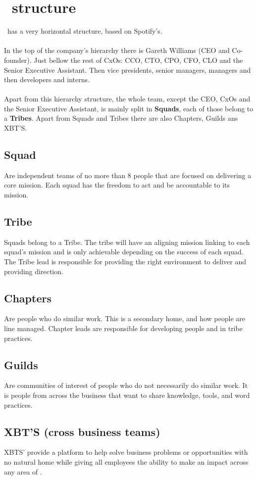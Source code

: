 \chapter{\company\ structure} 

\label{appendix_a}

\company\ has a very horizontal structure, based on Spotify's\cite{culture_of_growth}.
\\\\
In the top of the company's hierarchy there is Gareth Williams (CEO and Co-founder). Just bellow the rest of CxOs: CCO, CTO, CPO, CFO, CLO and the Senior Executive Assistant. Then vice presidents, senior managers, managers and then developers and interns\cite{crew_chart}.
\\\\
Apart from this hierarchy structure, the whole team, except the CEO, CxOs and the Senior Executive Assistant, is mainly split in \textbf{Squads}, each of those belong to a \textbf{Tribes}. Apart from Squads and Tribes there are also Chapters, Guilds ans XBT'S\cite{how_skyscanner_works}.

\section*{Squad}

Are independent teams of no more than 8 people that are focused on delivering a core mission. Each squad has the freedom to act and be accountable to its mission.

\section*{Tribe}

Squads belong to a Tribe. The tribe will have an aligning mission linking to each squad's mission and is only achievable depending on the success of each squad. The Tribe lead is responsible for providing the right environment to deliver and providing direction. 

\section*{Chapters}

Are people who do similar work. This is a secondary home, and how people are line managed. Chapter leads are responsible for developing people and in tribe practices.

\section*{Guilds}

Are communities of interest of people who do not necessarily do similar work. It is people from across the business that want to share knowledge, tools, and word practices. 

\section*{XBT'S (cross business teams)}

XBTS' provide a platform to help solve business problems or opportunities with no natural home while giving all employees the ability to make an impact across any area of \company.